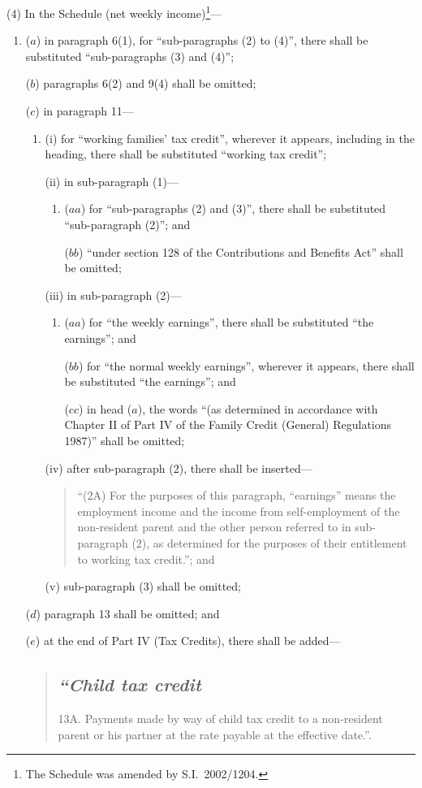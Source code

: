 \documentclass[12pt,a4paper]{article}
\begin{document}
(4) In the Schedule (net weekly income)\footnote{The Schedule was amended by S.I.\ 2002/1204.}—
\begin{enumerate}\item[]
($a$) in paragraph 6(1), for “sub-paragraphs (2) to (4)”, there shall be substituted “sub-paragraphs (3) and (4)”;

($b$) paragraphs 6(2) and 9(4) shall be omitted;

($c$) in paragraph 11—
\begin{enumerate}\item[]
(i) for “working families' tax credit”, wherever it appears, including in the heading, there shall be substituted “working tax credit”;

(ii) in sub-paragraph (1)—
\begin{enumerate}\item[]
($aa$) for “sub-paragraphs (2) and (3)”, there shall be substituted “sub-paragraph (2)”; and

($bb$) “under section 128 of the Contributions and Benefits Act” shall be omitted;
\end{enumerate}

(iii) in sub-paragraph (2)—
\begin{enumerate}\item[]
($aa$) for “the weekly earnings”, there shall be substituted “the earnings”; and

($bb$) for “the normal weekly earnings”, wherever it appears, there shall be substituted “the earnings”; and

($cc$) in head ($a$), the words “(as determined in accordance with Chapter II of Part IV of the Family Credit (General) Regulations 1987)” shall be omitted;
\end{enumerate}

(iv) after sub-paragraph (2), there shall be inserted—
\begin{quotation}
“(2A) For the purposes of this paragraph, “earnings” means the employment income and the income from self-employment of the non-resident parent and the other person referred to in sub-paragraph (2), as determined for the purposes of their entitlement to working tax credit.”; and
\end{quotation}

(v) sub-paragraph (3) shall be omitted;
\end{enumerate}

($d$) paragraph 13 shall be omitted; and

($e$) at the end of Part IV (Tax Credits), there shall be added—
\begin{quotation}
\subsection*{\itshape “Child tax credit}

13A.  Payments made by way of child tax credit to a non-resident parent or his partner at the rate payable at the effective date.”.
\end{quotation}
\end{enumerate}
\end{document}
